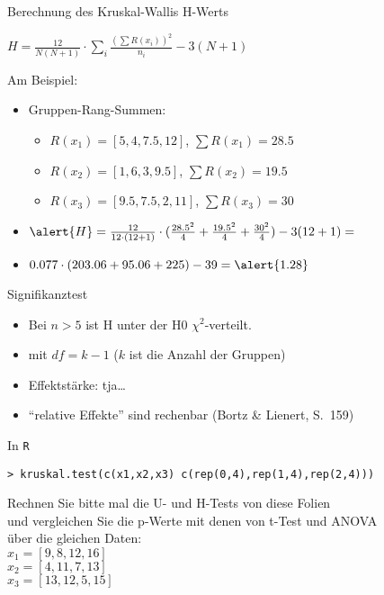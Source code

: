 \begin{frame}
  {Berechnung des Kruskal-Wallis H-Werts}
  \begin{center}
    \alert{$H=\frac{12}{N(N+1)}\cdot\sum\limits_i \frac{(\sum R(x_i))^2}{n_i}-3(N+1)$}
  \end{center}
  \pause
  Am Beispiel:
  \begin{itemize}[<+->]
    \item Gruppen-Rang-Summen:
      \begin{itemize}
	\item $R(x_1)=[5,4,7.5,12]$, \alert{$\sum R(x_1)=28.5$}
	\item $R(x_2)=[1,6,3,9.5]$, \alert{$\sum R(x_2)=19.5$}
	\item $R(x_3)=[9.5,7.5,2,11]$, \alert{$\sum R(x_3)=30$}
      \end{itemize}
    \item $\alert{H}=\frac{12}{12\cdot(12+1)}\cdot(\frac{28.5^2}{4}+\frac{19.5^2}{4}+\frac{30^2}{4})-3(12+1)=$
    \item $0.077\cdot(203.06+95.06+225)-39=\alert{1.28}$
  \end{itemize}
\end{frame}

\begin{frame}
  {Signifikanztest}
  \begin{itemize}[<+->]
    \item Bei $n>5$ ist H unter der H0 \alert{$\chi^2$-verteilt}.
    \item mit \alert{$df=k-1$} ($k$ ist die Anzahl der Gruppen)
      \Zeile
    \item Effektstärke: tja\ldots
    \item "`relative Effekte"' sind rechenbar (Bortz \& Lienert, S.\ 159)
  \end{itemize}
\end{frame}

\begin{frame}
  {In \texttt{R}}
  \begin{center}
    \alert{\texttt{> kruskal.test(c(x1,x2,x3)~c(rep(0,4),rep(1,4),rep(2,4)))}}
  \end{center}
  Rechnen Sie bitte mal die U- und H-Tests von diese Folien\\
  und vergleichen Sie die p-Werte mit denen von t-Test und ANOVA\\
  über die gleichen Daten:\\[3ex]
  $x_1=[9,8,12,16]$\\
  $x_2=[4,11,7,13]$\\
  $x_3=[13,12,5,15]$
\end{frame}

